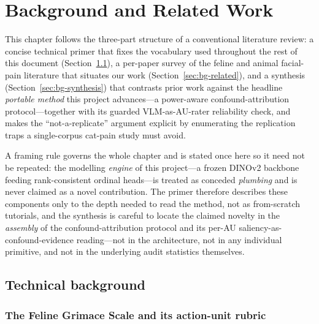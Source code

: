 \chapter{Background and Related Work}
\label{ch:background}

This chapter follows the three-part structure of a conventional literature
review: a concise technical primer that fixes the vocabulary used throughout the
rest of this document (Section~\ref{sec:bg-primer}), a per-paper survey of the
feline and animal facial-pain literature that situates our work
(Section~\ref{sec:bg-related}), and a synthesis
(Section~\ref{sec:bg-synthesis}) that contrasts prior work against the headline
\emph{portable method} this project advances---a power-aware confound-attribution
protocol---together with its guarded VLM-as-AU-rater reliability check, and makes
the \enquote{not-a-replicate} argument explicit by enumerating the replication
traps a single-corpus cat-pain study must avoid.

A framing rule governs the whole chapter and is stated once here so it need not
be repeated: the modelling \emph{engine} of this project---a frozen DINOv2
backbone feeding rank-consistent ordinal heads---is treated as conceded
\emph{plumbing} and is never claimed as a novel contribution. The primer
therefore describes these components only to the depth needed to read the
method, not as from-scratch tutorials, and the synthesis is careful to locate
the claimed novelty in the \emph{assembly} of the confound-attribution protocol
and its per-AU saliency-as-confound-evidence reading---not in the architecture,
not in any individual primitive, and not in the underlying audit statistics
themselves.

\section{Technical background}
\label{sec:bg-primer}

\subsection{The Feline Grimace Scale and its action-unit rubric}
\label{subsec:bg-fgs}

